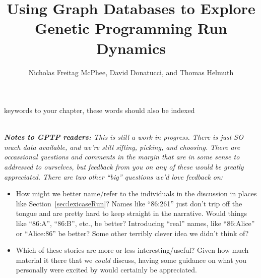 %


\title*{Using Graph Databases to Explore Genetic Programming Run Dynamics}
\author{Nicholas Freitag McPhee, David Donatucci, and Thomas Helmuth}

\maketitle


\begin{keywords}
keywords to your chapter, these words should also be indexed
\end{keywords}
\\

\emph{\textbf{Notes to GPTP readers:} This is still a work in progress. There is just SO much
	data available, and we're still sifting, picking, and choosing. There are occassional questions 
	and comments in the margin that are in some sense to addressed to ourselves, but feedback from
	you on any of these would be greatly appreciated. There are two other ``big'' questions we'd
	love feedback on:}
\begin{itemize}
	\item How might we better name/refer to the individuals in the discussion in places like
	Section~\ref{sec:lexicaseRun}? Names like ``86:261'' just don't trip off the tongue and are
	pretty hard to keep straight in the narrative. Would things like ``86:A'', ``86:B'', etc., be
	better? Introducing ``real'' names, like ``86:Alice'' or ``Alice:86'' be better? Some other
	terribly clever idea we didn't think of?
	\item Which of these stories are more or less interesting/useful? Given how much material
	it there that we \emph{could} discuss, having some guidance on what you personally were
	excited by would certainly be appreciated.
\end{itemize}

